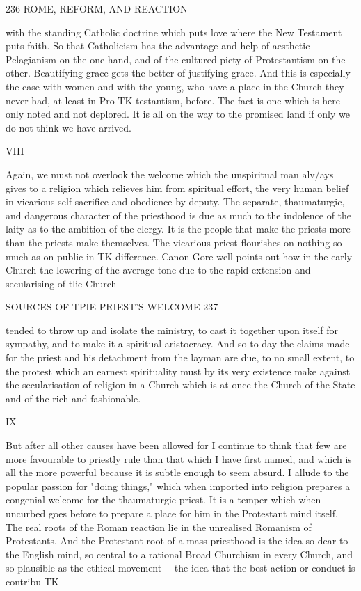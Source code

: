 \documentclass[12pt,a5paper,twoside]{book}
\begin{document}
{236 ROME, REFORM, AND REACTION 

with the standing Catholic doctrine which puts love 
where the New Testament puts faith. So that 
Catholicism has the advantage and help of aesthetic 
Pelagianism on the one hand, and of the cultured piety 
of Protestantism on the other. Beautifying grace gets 
the better of justifying grace. And this is especially 
the case with women and with the young, who have 
a place in the Church they never had, at least in Pro-TK
testantism, before. The fact is one which is here 
only noted and not deplored. It is all on the way to 
the promised land if only we do not think we have 
arrived. 

VIII 

Again, we must not overlook the welcome which 
the unspiritual man alv/ays gives to a religion which 
relieves him from spiritual effort, the very human 
belief in vicarious self-sacrifice and obedience by 
deputy. The separate, thaumaturgic, and dangerous 
character of the priesthood is due as much to the 
indolence of the laity as to the ambition of the 
clergy. It is the people that make the priests more 
than the priests make themselves. The vicarious 
priest flourishes on nothing so much as on public in-TK
difference. Canon Gore well points out how in the 
early Church the lowering of the average tone due to 
the rapid extension and secularising of tlie Church 



SOURCES OF TPIE PRIEST'S WELCOME 237 

tended to throw up and isolate the ministry, to cast it 
together upon itself for sympathy, and to make it a 
spiritual aristocracy. And so to-day the claims made 
for the priest and his detachment from the layman are 
due, to no small extent, to the protest which an earnest 
spirituality must by its very existence make against 
the secularisation of religion in a Church which is at 
once the Church of the State and of the rich and 
fashionable. 

IX 

But after all other causes have been allowed for I 
continue to think that few are more favourable to 
priestly rule than that which I have first named, and 
which is all the more powerful because it is subtle 
enough to seem absurd. I allude to the popular 
passion for "doing things," which when imported 
into religion prepares a congenial welcome for the 
thaumaturgic priest. It is a temper which when 
uncurbed goes before to prepare a place for him in 
the Protestant mind itself. The real roots of the 
Roman reaction lie in the unrealised Romanism of 
Protestants. And the Protestant root of a mass 
priesthood is the idea so dear to the English mind, 
so central to a rational Broad Churchism in every 
Church, and so plausible as the ethical movement---
the idea that the best action or conduct is contribu-TK



}
\end{document}
